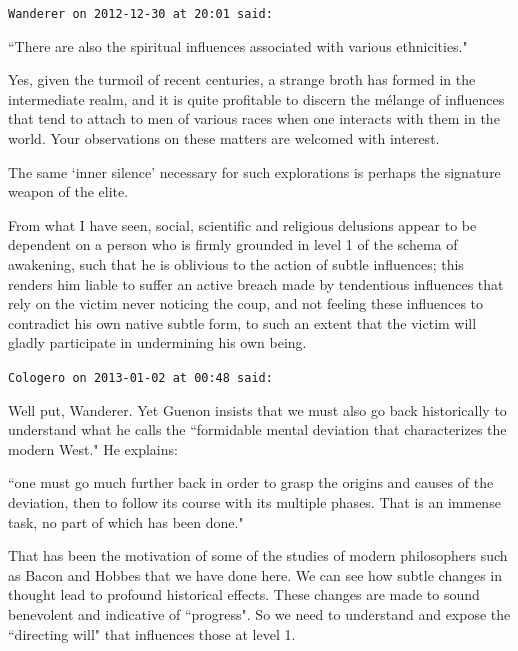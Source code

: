 \begin{footnotesize}\begin{sffamily}



\texttt{Wanderer on 2012-12-30 at 20:01 said: }

``There are also the spiritual influences associated with various ethnicities."

Yes, given the turmoil of recent centuries, a strange broth has formed in the intermediate realm, and it is quite profitable to discern the mélange of influences that tend to attach to men of various races when one interacts with them in the world. Your observations on these matters are welcomed with interest.

The same `inner silence' necessary for such explorations is perhaps the signature weapon of the elite.

From what I have seen, social, scientific and religious delusions appear to be dependent on a person who is firmly grounded in level 1 of the schema of awakening, such that he is oblivious to the action of subtle influences; this renders him liable to suffer an active breach made by tendentious influences that rely on the victim never noticing the coup, and not feeling these influences to contradict his own native subtle form, to such an extent that the victim will gladly participate in undermining his own being.


\hfill

\texttt{Cologero on 2013-01-02 at 00:48 said: }

Well put, Wanderer. Yet Guenon insists that we must also go back historically to understand what he calls the ``formidable mental deviation that characterizes the modern West." He explains:

``one must go much further back in order to grasp the origins and causes of the deviation, then to follow its course with its multiple phases. That is an immense task, no part of which has been done."

That has been the motivation of some of the studies of modern philosophers such as Bacon and Hobbes that we have done here. We can see how subtle changes in thought lead to profound historical effects. These changes are made to sound benevolent and indicative of ``progress". So we need to understand and expose the ``directing will" that influences those at level 1.


\end{sffamily}\end{footnotesize}
